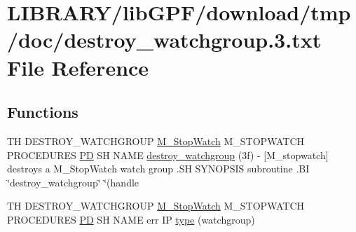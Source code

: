 \hypertarget{destroy__watchgroup_83_8txt}{}\section{L\+I\+B\+R\+A\+R\+Y/lib\+G\+P\+F/download/tmp/doc/destroy\+\_\+watchgroup.3.txt File Reference}
\label{destroy__watchgroup_83_8txt}
\subsection*{Functions}
\begin{DoxyCompactItemize}
\item 
TH D\+E\+S\+T\+R\+O\+Y\+\_\+\+W\+A\+T\+C\+H\+G\+R\+O\+UP \hyperlink{option__stopwatch_83_8txt_aa2011fc45a5e502e87ee50996a8a9305}{M\+\_\+\+Stop\+Watch} M\+\_\+\+S\+T\+O\+P\+W\+A\+T\+CH P\+R\+O\+C\+E\+D\+U\+R\+ES \hyperlink{what__overview_81_8txt_a85f26da5a4481fbdb0d9c79f2b94de3e}{PD} SH N\+A\+ME \hyperlink{destroy__watchgroup_83_8txt_a9d6e4dae97c8ce07a61d89382e7692e0}{destroy\+\_\+watchgroup} (3f) -\/ \mbox{[}\+M\+\_\+stopwatch\mbox{]} destroys a M\+\_\+\+Stop\+Watch watch group .\+S\+H S\+Y\+N\+O\+P\+S\+I\+S subroutine .\+B\+I \char`\"{}destroy\+\_\+watchgroup\char`\"{} \char`\"{}(handle
\item 
TH D\+E\+S\+T\+R\+O\+Y\+\_\+\+W\+A\+T\+C\+H\+G\+R\+O\+UP \hyperlink{option__stopwatch_83_8txt_aa2011fc45a5e502e87ee50996a8a9305}{M\+\_\+\+Stop\+Watch} M\+\_\+\+S\+T\+O\+P\+W\+A\+T\+CH P\+R\+O\+C\+E\+D\+U\+R\+ES \hyperlink{what__overview_81_8txt_a85f26da5a4481fbdb0d9c79f2b94de3e}{PD} SH N\+A\+ME err IP \hyperlink{destroy__watchgroup_83_8txt_ab623f536d615ff3d6357e73f12566b46}{type} (watchgroup)
\item 

\end{DoxyCompactItemize}
